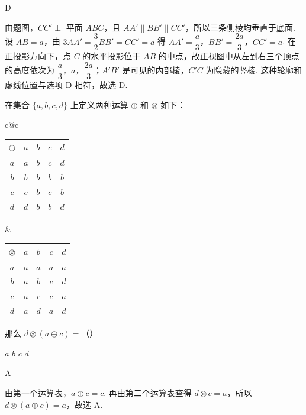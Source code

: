 \begin{answer}
D
\end{answer}

\begin{solution}
由题图，\(CC'\perp\) 平面 \(ABC\)，且 \(AA'\parallel BB'\parallel CC'\)，所以三条侧棱均垂直于底面. 设 \(AB=a\)，由
\(3AA'=\dfrac32BB'=CC'=a\) 得
\(AA'=\dfrac a3\)，\(BB'=\dfrac{2a}{3}\)，\(CC'=a\). 在正投影方向下，点 \(C\) 的水平投影位于 \(AB\) 的中点，故正视图中从左到右三个顶点的高度依次为 \(\dfrac a3\)，\(a\)，\(\dfrac{2a}{3}\)；\(A'B'\) 是可见的内部棱，\(C'C\) 为隐藏的竖棱. 这种轮廓和虚线位置与选项 D 相符，故选 D.
\end{solution}

\begin{problem}
在集合 \(\{a, b, c, d\}\) 上定义两种运算 \(\oplus\) 和 \(\otimes\) 如下：

\begin{center}
\begin{tabular}{c@{\qquad}c}
\begin{tabular}{c|cccc}
\(\oplus\) & \(a\) & \(b\) & \(c\) & \(d\) \\
\hline
\(a\) & \(a\) & \(b\) & \(c\) & \(d\) \\
\(b\) & \(b\) & \(b\) & \(b\) & \(b\) \\
\(c\) & \(c\) & \(b\) & \(c\) & \(b\) \\
\(d\) & \(d\) & \(b\) & \(b\) & \(d\)
\end{tabular}
&
\begin{tabular}{c|cccc}
\(\otimes\) & \(a\) & \(b\) & \(c\) & \(d\) \\
\hline
\(a\) & \(a\) & \(a\) & \(a\) & \(a\) \\
\(b\) & \(a\) & \(b\) & \(c\) & \(d\) \\
\(c\) & \(a\) & \(c\) & \(c\) & \(a\) \\
\(d\) & \(a\) & \(d\) & \(a\) & \(d\)
\end{tabular}
\end{tabular}
\end{center}

那么 \(d \otimes (a \oplus c) =\)（\quad）

\choices
    {\(a\)}
    {\(b\)}
    {\(c\)}
    {\(d\)}
\end{problem}

\begin{answer}
A
\end{answer}

\begin{solution}
由第一个运算表，\(a\oplus c=c\). 再由第二个运算表查得 \(d\otimes c=a\)，所以
\(d\otimes(a\oplus c)=a\)，故选 A.
\end{solution}


